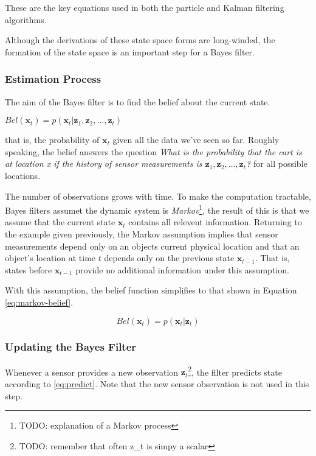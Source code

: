 These are the key equations used in both the particle and Kalman filtering
algorithms.

Although the derivations of these state space forms are long-winded, the
formation of the state space is an important step for a Bayes filter.

\subsubsection{Estimation Process}
The aim of the Bayes filter is to find the belief about the current state.

\begin{math}
Bel(\mathbf{x}_{t}) = p(\mathbf{x}_{t} | \mathbf{z}_{1}, \mathbf{z}_{2}, \dots
, \mathbf{z}_{t})
\end{math}

that is, the probability of $\mathbf{x}_{t}$ given all the data we've seen so far.
Roughly speaking, the belief answers the question \emph{What is the probability
that the cart is at location x if the history of sensor measurements is
$\mathbf{z}_{1}, \mathbf{z}_{2}, \dots, \mathbf{z}_{t}$?} for all possible
locations.

The number of observations grows with time. To make the computation tractable,
Bayes filters assumet the dynamic system is \emph{Markov}\footnote{TODO:
explanation of a Markov process}, the result of this is that we assume that the
current state $\mathbf{x}_{t}$ contains all relevent information. Returning to
the example given previously, the Markov assumption implies that sensor measurements
depend only on an objects current physical location and that an object's location at
time $t$ depends only on the previous state $\mathbf{x}_{t-1}$. That is, states
before $\mathbf{x}_{t-1}$ provide no additional information under this assumption.

With this assumption, the belief function simplifies to that shown in
Equation \ref{eq:markov-belief}.

\begin{equation}\label{eq:markov-belief}
Bel(\mathbf{x}_{t}) = p(\mathbf{x}_{t} | \mathbf{z}_{t})
\end{equation}

\subsubsection{Updating the Bayes Filter}
Whenever a sensor provides a new observation $\mathbf{z}_{t}$\footnote{TODO:
remember that often z\_t is simpy a scalar}, the filter predicts state according
to \ref{eq:predict}. Note that the new sensor observation is not used in this step.

